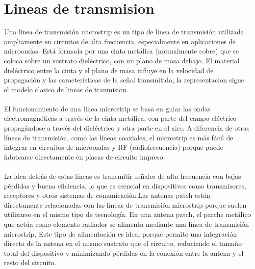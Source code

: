 %
%

\section{Lineas de transmision}
Una línea de transmisión microstrip es un tipo de línea de transmisión utilizada ampliamente en circuitos de alta frecuencia, especialmente en aplicaciones de microondas. Está formada por una cinta metálica (normalmente cobre) que se coloca sobre un sustrato dieléctrico, con un plano de masa debajo. El material dieléctrico entre la cinta y el plano de masa influye en la velocidad de propagación y las características de la señal transmitida, la representacion sigue el modelo clasico de lineas de tranmision.\\\\
El funcionamiento de una línea microstrip se basa en guiar las ondas electromagnéticas a través de la cinta metálica, con parte del campo eléctrico propagándose a través del dieléctrico y otra parte en el aire. A diferencia de otras líneas de transmisión, como las líneas coaxiales, el microstrip es más fácil de integrar en circuitos de microondas y RF (radiofrecuencia) porque puede fabricarse directamente en placas de circuito impreso.\\\\
La idea detrás de estas líneas es transmitir señales de alta frecuencia con bajas pérdidas y buena eficiencia, lo que es esencial en dispositivos como transmisores, receptores y otros sistemas de comunicación.Las antenas patch están directamente relacionadas con las líneas de transmisión microstrip porque suelen utilizarse en el mismo tipo de tecnología. En una antena patch, el parche metálico que actúa como elemento radiador se alimenta mediante una línea de transmisión microstrip. Este tipo de alimentación es ideal porque permite una integración directa de la antena en el mismo sustrato que el circuito, reduciendo el tamaño total del dispositivo y minimizando pérdidas en la conexión entre la antena y el resto del circuito.
